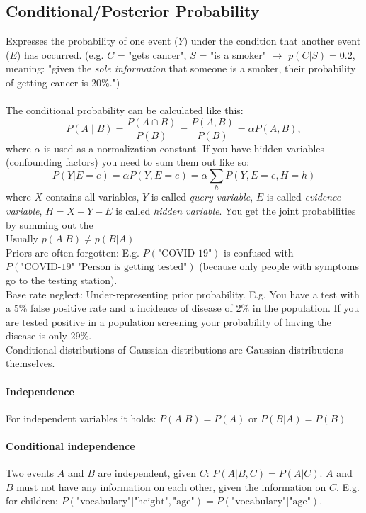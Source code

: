 \documentclass[../main.tex]{subfiles}
\begin{document}
\subsection{Conditional/Posterior Probability}  \label{posterior}
    Expresses the probability of one event ($Y$) under the condition that another event ($E$) has occurred. (e.g. $C$ = "gets cancer", $S$ = "is a smoker" $\rightarrow$ $p(C|S)=0.2$, meaning: "given the \textit{sole information} that someone is a smoker, their probability of getting cancer is 20\%.") \\
        \\The conditional probability can be calculated like this: 
        $$
        P(A \mid B) = \frac{P(A \cap B)}{P(B)}=\frac{P(A, B)}{P(B)}=\alpha{P(A, B)},
        $$
        where $\alpha$ is used as a normalization constant. If you have hidden variables (confounding factors) you need to sum them out like so:
        $$P(Y|E=e)=\alpha P(Y,E=e)=\alpha\sum_h P(Y,E=e,H=h)$$
        where $X$ contains all variables, $Y$ is called \textit{query variable}, $E$ is called \textit{evidence variable}, $H=X-Y-E$ is called \textit{hidden variable}. You get the joint probabilities by summing out the \\
        \attention Usually $p(A|B) \neq p(B|A)$ \\
        \attention Priors are often forgotten: E.g. $P(\text{"COVID-19"})$ is confused with $P(\text{"COVID-19"}|\text{"Person is getting tested"})$ (because only people with symptoms go to the testing station). \\
        \attention Base rate neglect: Under-representing prior probability. E.g. You have a test with a 5\% false positive rate and a incidence of disease of 2\% in the population. If you are tested positive in a population screening your probability of having the disease is only 29\%. \\
        \btw Conditional distributions of Gaussian distributions are Gaussian distributions themselves.
        
    \paragraph{Independence}  For independent variables it holds: $P(A|B)=P(A)$ or $P(B|A)=P(B)$

    \paragraph{Conditional independence}  Two events $A$ and $B$ are independent, given $C$: $P(A|B,C)=P(A|C)$. $A$ and $B$ must not have any information on each other, given the information on $C$.  E.g. for children: $P(\text{"vocabulary"}|\text{"height"}, \text{"age"})= P(\text{"vocabulary"}|\text{"age"})$.
\end{document}
